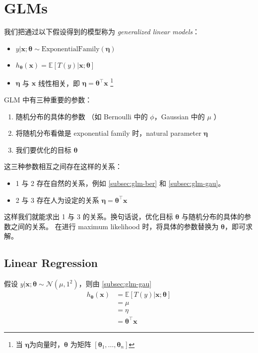 	\section{GLMs}
		我们把通过以下假设得到的模型称为 \emph{generalized linear models}：
		\begin{itemize}
			\item $ y | \bm{x}; \bm{\theta} \sim \text{ExponentialFamily}(\bm{\eta}) $
			\item $ h_{\bm{\theta}}(\bm{x}) = \mathbb{E}[T(y)|\bm{x};\bm{\theta}] $
			\item $ \bm{\eta} $ 与 $ \bm{x} $ 线性相关，即 $ \bm{\eta} = \bm{\theta}^\intercal \bm{x} $ \footnote{当 $ \bm{\eta} $为向量时，$ \bm{\theta} $ 为矩阵 $ \left[ \bm{\theta}_1, \ldots, \bm{\theta}_n \right] $ }
		\end{itemize}
		GLM 中有三种重要的参数：
		\begin{enumerate}
			\item 随机分布的具体的参数 （如 Bernoulli 中的 $ \phi $，Gaussian 中的 $ \mu $ ）
			\item 将随机分布看做是 exponential family 时，natural parameter $ \bm{\eta} $ 
			\item 我们要优化的目标 $ \bm{\theta} $ 
		\end{enumerate}
		这三种参数相互之间存在这样的关系：
		\begin{itemize}
			\item 1 与 2 存在自然的关系，例如 \ref{subsec:glm-ber} 和 \ref{subsec:glm-gau}。
			\item 2 与 3 存在人为设定的关系 $ \bm{\eta} = \bm{\theta}^\intercal \bm{x} $
		\end{itemize}
		这样我们就能求出 1 与 3 的关系。换句话说，优化目标 $ \bm{\theta} $ 与随机分布的具体的参数之间的关系。
		在进行 maximum likelihood 时，将具体的参数替换为 $ \bm{\theta} $，即可求解。
		
		\subsection{Linear Regression}
			假设 $ y|\bm{x};\bm{\theta} \sim \mathcal{N}(\mu, 1^2) $，则由 \ref{subsec:glm-gau}
			\begin{align*}
				h_{\bm{\theta}} (\bm{x}) &= \mathbb{E} [T(y) | \bm{x}; \bm{\theta}] \\
				&= \mu \\
				&= \eta \\
				&= \bm{\theta}^\intercal \bm{x} 
			\end{align*}
			
